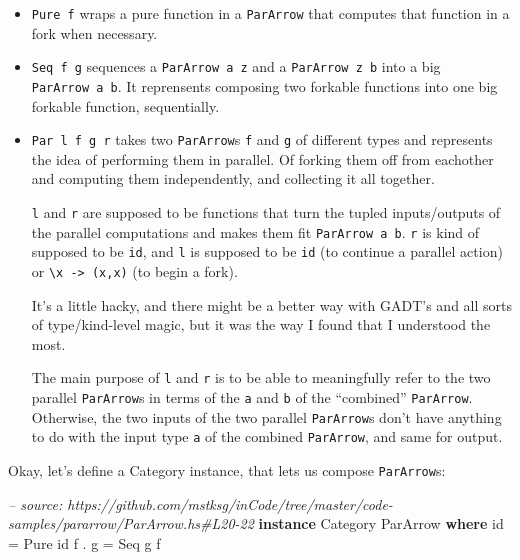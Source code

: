 \documentclass[]{article}
\newenvironment{Shaded}{}{}
\newcommand{\KeywordTok}[1]{\textcolor[rgb]{0.00,0.44,0.13}{\textbf{{#1}}}}
\newcommand{\DataTypeTok}[1]{\textcolor[rgb]{0.56,0.13,0.00}{{#1}}}
\newcommand{\CommentTok}[1]{\textcolor[rgb]{0.38,0.63,0.69}{\textit{{#1}}}}
\newcommand{\FunctionTok}[1]{\textcolor[rgb]{0.02,0.16,0.49}{{#1}}}
\newcommand{\NormalTok}[1]{{#1}}
\begin{document}
\begin{itemize}
\item
  \texttt{Pure\ f} wraps a pure function in a \texttt{ParArrow} that
  computes that function in a fork when necessary.
\item
  \texttt{Seq\ f\ g} sequences a \texttt{ParArrow\ a\ z} and a
  \texttt{ParArrow\ z\ b} into a big \texttt{ParArrow\ a\ b}. It
  reprensents composing two forkable functions into one big forkable
  function, sequentially.
\item
  \texttt{Par\ l\ f\ g\ r} takes two \texttt{ParArrow}s \texttt{f} and
  \texttt{g} of different types and represents the idea of performing
  them in parallel. Of forking them off from eachother and computing
  them independently, and collecting it all together.

  \texttt{l} and \texttt{r} are supposed to be functions that turn the
  tupled inputs/outputs of the parallel computations and makes them fit
  \texttt{ParArrow\ a\ b}. \texttt{r} is kind of supposed to be
  \texttt{id}, and \texttt{l} is supposed to be \texttt{id} (to continue
  a parallel action) or
  \texttt{\textbackslash{}x\ -\textgreater{}\ (x,x)} (to begin a fork).

  It's a little hacky, and there might be a better way with GADT's and
  all sorts of type/kind-level magic, but it was the way I found that I
  understood the most.

  The main purpose of \texttt{l} and \texttt{r} is to be able to
  meaningfully refer to the two parallel \texttt{ParArrow}s in terms of
  the \texttt{a} and \texttt{b} of the ``combined'' \texttt{ParArrow}.
  Otherwise, the two inputs of the two parallel \texttt{ParArrow}s don't
  have anything to do with the input type \texttt{a} of the combined
  \texttt{ParArrow}, and same for output.
\end{itemize}

Okay, let's define a Category instance, that lets us compose
\texttt{ParArrow}s:

\begin{Shaded}
\begin{Highlighting}[]
\CommentTok{-- source: https://github.com/mstksg/inCode/tree/master/code-samples/pararrow/ParArrow.hs#L20-22}
\KeywordTok{instance} \DataTypeTok{Category} \DataTypeTok{ParArrow} \KeywordTok{where}
    \NormalTok{id    }\FunctionTok{=} \DataTypeTok{Pure} \NormalTok{id}
    \NormalTok{f }\FunctionTok{.} \NormalTok{g }\FunctionTok{=} \DataTypeTok{Seq} \NormalTok{g f}
\end{Highlighting}
\end{Shaded}
\end{document}
